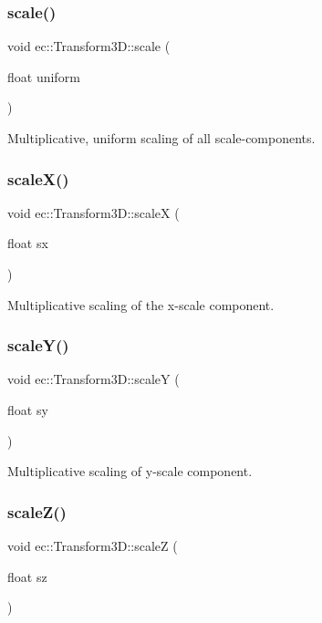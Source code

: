 \subsubsection{\texorpdfstring{scale()}{scale()}\hspace{0.1cm}{\footnotesize\ttfamily [3/3]}}
{\footnotesize\ttfamily void ec\+::\+Transform3\+D\+::scale (\begin{DoxyParamCaption}\item[{float}]{uniform }\end{DoxyParamCaption})}

Multiplicative, uniform scaling of all scale-\/components. \mbox{\label{classec_1_1_transform3_d_a3b859bc4f4b47e9d4b1e322c811a9e29}} 
\subsubsection{\texorpdfstring{scale\+X()}{scaleX()}}
{\footnotesize\ttfamily void ec\+::\+Transform3\+D\+::scaleX (\begin{DoxyParamCaption}\item[{float}]{sx }\end{DoxyParamCaption})}

Multiplicative scaling of the x-\/scale component. \mbox{\label{classec_1_1_transform3_d_a2b15e39c5a79379c361fb515a163c6de}} 
\subsubsection{\texorpdfstring{scale\+Y()}{scaleY()}}
{\footnotesize\ttfamily void ec\+::\+Transform3\+D\+::scaleY (\begin{DoxyParamCaption}\item[{float}]{sy }\end{DoxyParamCaption})}

Multiplicative scaling of y-\/scale component. \mbox{\label{classec_1_1_transform3_d_a61b556423d4c5dffd55f40685b0cb777}} 
\subsubsection{\texorpdfstring{scale\+Z()}{scaleZ()}}
{\footnotesize\ttfamily void ec\+::\+Transform3\+D\+::scaleZ (\begin{DoxyParamCaption}\item[{float}]{sz }\end{DoxyParamCaption})}

